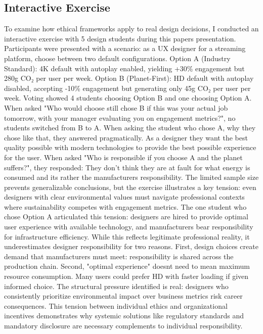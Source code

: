 \subsection{Interactive Exercise}
To examine how ethical frameworks apply to real design decisions, I conducted an interactive exercise with 5 design students during this papers presentation. Participants were presented with a scenario: as a UX designer for a streaming platform, choose between two default configurations. Option A (Industry Standard): 4K default with autoplay enabled, yielding +30\% engagement but 280g CO₂ per user per week. Option B (Planet-First): HD default with autoplay disabled, accepting -10\% engagement but generating only 45g CO₂ per user per week. Voting showed 4 students choosing Option B and one choosing Option A. When asked "Who would choose still chose B if this was your actual job tomorrow, with your manager evaluating you on engagement metrics?", no students switched from B to A. When asking the student who chose A, why they chose like that, they answered pragmatically. As a designer they want the best quality possible with modern technologies to provide the best possible experience for the user. When asked "Who is responsible if you choose A and the planet suffers?", they responded: They don't think they are at fault for what energy is consumed and its rather the manufacturers responsibility. The limited sample size prevents generalizable conclusions, but the exercise
illustrates a key tension: even designers with clear environmental values must
navigate professional contexts where sustainability competes with engagement
metrics. The one student who chose Option A articulated this tension: designers
are hired to provide optimal user experience with available technology, and
manufacturers bear responsibility for infrastructure efficiency. While this reflects legitimate professional reality, it underestimates designer
responsibility for two reasons. First, design choices create demand that
manufacturers must meet: responsibility is shared across the production chain.
Second, "optimal experience" doesnt need to mean maximum resource consumption. Many
users could prefer HD with faster loading if given informed choice. The structural pressure identified is real: designers who consistently prioritize
environmental impact over business metrics risk career consequences. This tension
between individual ethics and organizational incentives demonstrates why systemic
solutions like regulatory standards and mandatory disclosure are necessary complements
to individual responsibility.

